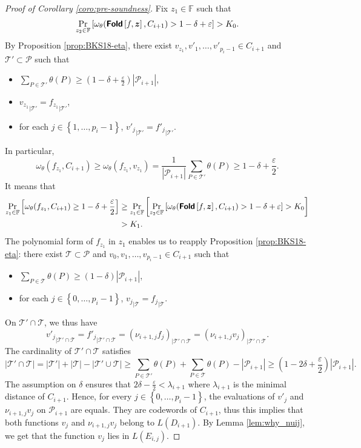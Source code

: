 \documentclass[a4paper,USenglish,autoref]{lipics-v2021}
\renewcommand\epsilon{\varepsilon}
\newcommand\F{\mathbb{F}}
\newcommand\fold[1]{\textsf{\textbf{Fold}}\left[#1\right]}
\def\rest#1#2{{{#1}_{|#2}}}
\renewcommand{\vec}[1]{\boldsymbol{#1}}
\newcommand{\set}[1]{\left\{#1\right\}}
\newcommand{\size}[1]{\left|#1\right|}
\newcommand{\range}[1]{\set{0,\dots,#1-1}}
\newcommand{\Range}[2]{\set{#1,\dots,#2}}
\newcommand\bfz{{\vec{z}}}
\newcommand\calP{\mathcal{P}}
\newcommand\calT{\mathcal{T}}
\begin{document}
\begin{proof}[Proof of Corollary \ref{coro:pre-soundness}]
	
	Fix $z_1 \in \F$ such that \[\Pr_{z_2 \in \F} \left[\omega_\theta(\fold{f, \bfz}, C_{i+1}) > 1 - \delta + \epsilon\right] > K_0.\] By Proposition \ref{prop:BKS18-eta}, there exist $v_{z_1},v'_1,\dots,v'_{p_i-1} \in C_{i+1}$ and $\calT' \subset \calP$ such that
	\begin{itemize}
		\item $\sum_{P \in \calT'} \theta(P)  \ge (1 - \delta+ \frac{\epsilon}{2})\size{\calP_{i+1}}$,
		\item $\rest{v_{z_1}}{\calT'}=\rest{f_{z_1}}{\calT'}$,
		\item for each $j \in \Range{1}{p_i-1}$, $\rest{v'_j}{\calT'} = \rest{f'_j}{\calT'}$.
	\end{itemize}
	In particular, \[\omega_\theta(f_{z_1},C_{i+1}) \geq \omega_\theta(f_{z_1},v_{z_1}) =  \frac{1}{\size{\calP_{i+1}}}\sum_{P \in \calT'} \theta(P) \geq 1- \delta + \frac{\epsilon}{2}.\]   
	It means that
	\begin{align*}  \Pr_{z_1 \in \F} \left[\omega_\theta(f_{z_1},C_{i+1}) \geq 1-\delta+ \frac{\epsilon}{2} \right] &\geq \Pr_{z_1 \in \F}\left[ \Pr_{z_2 \in \F} \left[\omega_\theta(\fold{f, \bfz}, C_{i+1}) > 1 - \delta + \epsilon\right]  > K_0 \right] \\ &> K_1.
    \end{align*}
	The polynomial form of $f_{z_1}$ in $z_1$ enables us to reapply Proposition \ref{prop:BKS18-eta}: there exist $\calT \subset \calP$ and $v_0,v_1,\dots,v_{p_i-1} \in C_{i+1}$ such that
	\begin{itemize}
		\item $ \sum_{P \in \calT} \theta(P) \ge (1 - \delta)\size{\calP_{i+1}}$,
		\item for each $j \in \range{p_i}$, $\rest{v_j}{\calT} = \rest{f_j}{\calT}$.
	\end{itemize}
	On $\calT' \cap \calT$, we thus have \[\rest{v'_j}{\calT' \cap \calT}= \rest{f'_j}{\calT' \cap \calT}=\rest{(\nu_{i+1,j}f_j)}{\calT' \cap \calT}=\rest{(\nu_{i+1,j}v_j)}{\calT' \cap \calT}.\]
	The cardinality of $\calT' \cap \calT$ satisfies
	\[|\calT' \cap \calT| =|\calT'|+|\calT|-|\calT' \cup \calT| \geq \sum_{P \in \calT'} \theta(P)+\sum_{P \in \calT} \theta(P)-|\calP_{i+1}| \geq (1-2\delta+\frac{\epsilon}{2})|\calP_{i + 1}|.\]
	The assumption on $\delta$ ensures that $2\delta - \frac{\epsilon}{2} < \lambda_{i+1}$ where $\lambda_{i+1}$ is the minimal distance of $C_{i+1}$. Hence, for every $j \in \range{p_i}$, the evaluations of $v'_j$ and $\nu_{i+1,j}v_j$ on $\calP_{i+1}$ are equals. They are codewords of $C_{i+1}$, thus this implies that both functions $v_j$ and $\nu_{i+1,j}v_j$ belong to $L(D_{i+1})$. By Lemma \ref{lem:why_nuij}, we get that the function $v_j$ lies in $L(E_{i,j})$.
	

\end{proof}
\end{document}
